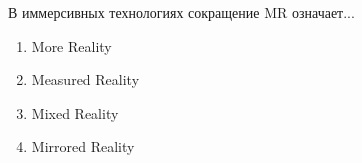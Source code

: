 
В иммерсивных технологиях сокращение MR означает...

\begin{enumerate}
    \item More Reality
    \item Measured Reality
    \item Mixed Reality
    \item Mirrored Reality
\end{enumerate}